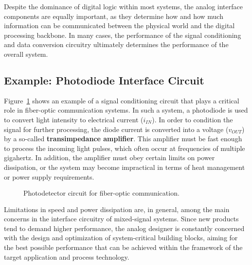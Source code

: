 \documentclass[
  11pt,
  letterpaper,
  abstract]{scrbook}
\begin{document}
Despite the dominance of digital logic within most systems, the analog
interface components are equally important, as they determine how and
how much information can be communicated between the physical world and
the digital processing backbone. In many cases, the performance of the
signal conditioning and data conversion circuitry ultimately determines
the performance of the overall system.

\subsection{Example: Photodiode Interface
Circuit}\label{example-photodiode-interface-circuit}

Figure~\ref{fig-1.4} shows an example of a signal conditioning circuit
that plays a critical role in fiber-optic communication systems. In such
a system, a photodiode is used to convert light intensity to electrical
current (\(i_{IN}\)). In order to condition the signal for further
processing, the diode current is converted into a voltage (\(v_{OUT}\))
by a so-called \textbf{transimpedance amplifier}. This amplifier must be
fast enough to process the incoming light pulses, which often occur at
frequencies of multiple gigahertz. In addition, the amplifier must obey
certain limits on power dissipation, or the system may become
impractical in terms of heat management or power supply requirements.

\begin{figure}


\caption{\label{fig-1.4}Photodetector circuit for fiber-optic
communication.}

\end{figure}%

Limitations in speed and power dissipation are, in general, among the
main concerns in the interface circuitry of mixed-signal systems. Since
new products tend to demand higher performance, the analog designer is
constantly concerned with the design and optimization of system-critical
building blocks, aiming for the best possible performance that can be
achieved within the framework of the target application and process
technology.
\end{document}
